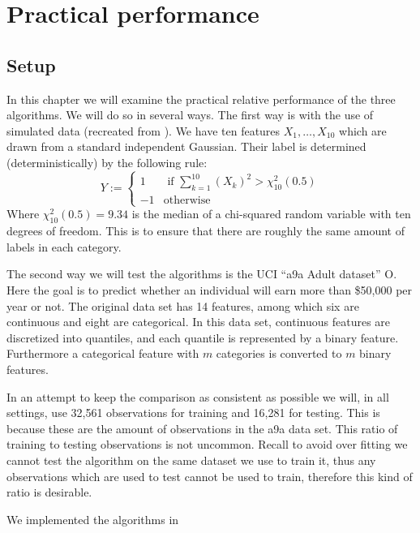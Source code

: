 


\chapter{Practical performance}
\label{chap:pracPerf}
\section{Setup}
\label{sec:Setup}
In this chapter we will examine the practical relative performance of the three algorithms. We will do so in several ways. The first way is with the use of simulated data (recreated from \cite{Hastie2009}). We have ten features $X_1,\ldots,X_{10}$ which are drawn from a standard independent Gaussian. Their label is determined (deterministically) by the following rule: $$Y:=\begin{cases}
1 & \text{ if } \sum_{k=1}^{10} (X_k)^2 > \chi_{10}^2(0.5)\\
-1 & \text{otherwise}
\end{cases}$$ Where $\chi_{10}^2(0.5)=9.34$ is the median of a chi-squared random variable with ten degrees of freedom. This is to ensure that there are roughly the same amount of labels in each category. 

\par The second way we will test the algorithms is the UCI ``a9a Adult dataset'' \cite{LIBSVM}O. Here the goal is to predict whether an individual will earn more than \$50,000 per year or not. The original data set has 14 features, among which six are continuous and eight are categorical. In this data set, continuous features are discretized into quantiles, and each quantile is represented by a binary feature. Furthermore a categorical feature with $m$ categories is converted to $m$ binary features. 

\par In an attempt to keep the comparison as consistent as possible we will, in all settings, use 32,561 observations for training and 16,281 for testing. This is because these are the amount of observations in the a9a data set. This ratio of training to testing observations is not uncommon. Recall to avoid over fitting we cannot test the algorithm on the same dataset we use to train it, thus any observations which are used to test cannot be used to train, therefore this kind of ratio is desirable.

\par We implemented the algorithms in 


